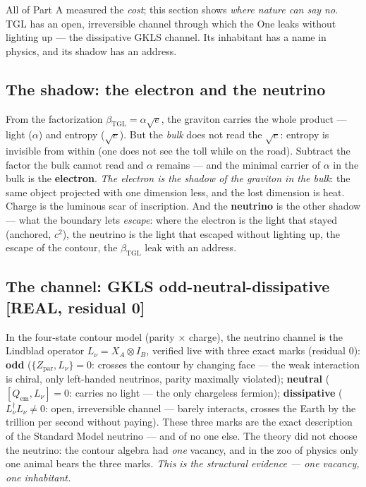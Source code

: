 \documentclass[11pt]{article}
\newcommand{\bTGL}{\beta_{\mathrm{TGL}}}\newcommand{\Msun}{M_{\odot}}\newcommand{\TGL}{\mathrm{TGL}}
\theoremstyle{definition}\newtheorem{deriv}{Derivation}
\begin{document}
All of Part A measured the \emph{cost}; this section shows \emph{where nature can say no}. TGL has an open, irreversible channel through which the One leaks without lighting up --- the dissipative GKLS channel. Its inhabitant has a name in physics, and its shadow has an address.

\subsection*{The shadow: the electron and the neutrino}

From the factorization $\bTGL=\alpha\sqrt e$, the graviton carries the whole product --- light ($\alpha$) and entropy ($\sqrt e$). But the \emph{bulk} does not read the $\sqrt e$: entropy is invisible from within (one does not see the toll while on the road). Subtract the factor the bulk cannot read and $\alpha$ remains --- and the minimal carrier of $\alpha$ in the bulk is the \textbf{electron}. \emph{The electron is the shadow of the graviton in the bulk}: the same object projected with one dimension less, and the lost dimension is heat. Charge is the luminous scar of inscription. And the \textbf{neutrino} is the other shadow --- what the boundary lets \emph{escape}: where the electron is the light that stayed (anchored, $c^2$), the neutrino is the light that escaped without lighting up, the escape of the contour, the $\bTGL$ leak with an address.

\subsection*{The channel: GKLS odd-neutral-dissipative \textsf{[REAL, residual 0]}}

In the four-state contour model (parity $\times$ charge), the neutrino channel is the Lindblad operator $L_\nu=X_A\otimes I_B$, verified live with three exact marks (residual $0$): \textbf{odd} ($\{Z_{\text{par}},L_\nu\}=0$: crosses the contour by changing face --- the weak interaction is chiral, only left-handed neutrinos, parity maximally violated); \textbf{neutral} ($[Q_{\text{em}},L_\nu]=0$: carries no light --- the only chargeless fermion); \textbf{dissipative} ($L_\nu^\dagger L_\nu\neq0$: open, irreversible channel --- barely interacts, crosses the Earth by the trillion per second without paying). These three marks are the exact description of the Standard Model neutrino --- and of no one else. The theory did not choose the neutrino: the contour algebra had \emph{one} vacancy, and in the zoo of physics only one animal bears the three marks. \emph{This is the structural evidence --- one vacancy, one inhabitant.}
\end{document}
